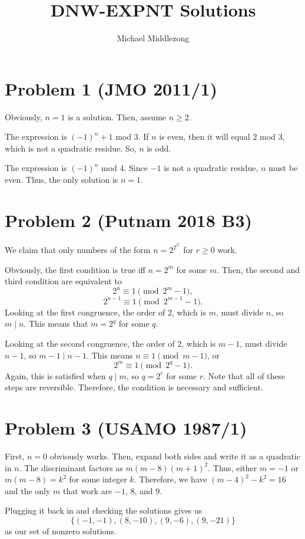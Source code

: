 \documentclass{scrartcl}
\title{DNW-EXPNT Solutions}
\author{Michael Middlezong}
\begin{document}
\maketitle

\section*{Problem 1 (JMO 2011/1)}
Obviously, $n=1$ is a solution. Then, assume $n\geq 2$.

The expression is $(-1)^n + 1$ mod 3. If $n$ is even, then it will equal $2$ mod 3, which is not a quadratic residue. So, $n$ is odd.

The expression is $(-1)^n$ mod 4. Since $-1$ is not a quadratic residue, $n$ must be even. Thus, the only solution is $n=1$.

\section*{Problem 2 (Putnam 2018 B3)}
We claim that only numbers of the form $n = 2^{2^{2^r}}$ for $r \geq 0$ work.

Obviously, the first condition is true iff $n = 2^m$ for some $m$. Then, the second and third condition are equivalent to
\[ 2^n \equiv 1 \pmod{2^{m} - 1}, \]
\[ 2^{n-1} \equiv 1 \pmod{2^{m-1} - 1}. \]
Looking at the first congruence, the order of $2$, which is $m$, must divide $n$, so $m \mid n$. This means that $m = 2^q$ for some $q$.

Looking at the second congruence, the order of $2$, which is $m-1$, must divide $n-1$, so $m-1 \mid n-1$. This means $n \equiv 1 \pmod{m - 1}$, or
\[ 2^m \equiv 1 \pmod{2^q - 1}. \]
Again, this is satisfied when $q \mid m$, so $q = 2^r$ for some $r$. Note that all of these steps are reversible. Therefore, the condition is necessary and sufficient.

\section*{Problem 3 (USAMO 1987/1)}
First, $n = 0$ obviously works. Then, expand both sides and write it as a quadratic in $n$. The discriminant factors as $m(m-8)(m+1)^2$. Thus, either $m = -1$ or $m(m-8) = k^2$ for some integer $k$. Therefore, we have $(m-4)^2 - k^2 = 16$ and the only $m$ that work are $-1$, $8$, and $9$.

Plugging it back in and checking the solutions gives us
\[ \{(-1,-1),(8,-10),(9,-6),(9,-21)\} \]
as our set of nonzero solutions.
\end{document}
